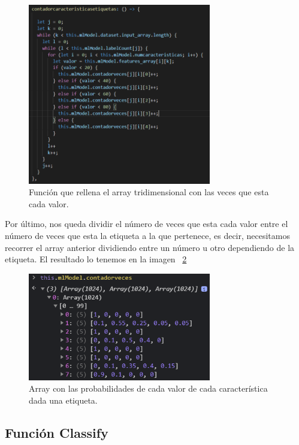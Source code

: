 \documentclass[a4paper, 12pt]{book}
\begin{document}
\begin{figure}
	\centering
	\includegraphics[width=8cm, keepaspectratio]{img/funcioncontador}
	\caption{Función que rellena el array tridimensional con las veces que esta cada valor.}			
	\label{fig:funcioncontador}
\end{figure}

Por último, nos queda dividir el número de veces que esta cada valor entre el número de veces que esta la etiqueta a la que pertenece, es decir, necesitamos recorrer el array anterior dividiendo entre un número u otro dependiendo de la etiqueta. El resultado lo tenemos en la imagen ~\ref{fig:probabilidadescalculadas}

\begin{figure}
	\centering
	\includegraphics[width=8cm, keepaspectratio]{img/probabilidadescalculadas}
	\caption{Array con las probabilidades de cada valor de cada característica dada una etiqueta.}			
	\label{fig:probabilidadescalculadas}
\end{figure}


\subsection{Función Classify} 
\label{sec:funcionclassifybayes}
\end{document}
